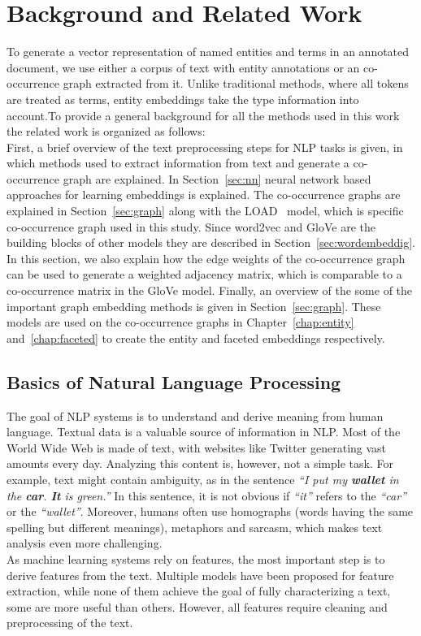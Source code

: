 
\chapter{Background and Related Work}\label{chap:background}
To generate a vector representation of named entities and terms in an annotated document, we use either a corpus of text with entity annotations or an co-occurrence graph extracted from it. Unlike traditional methods, where all tokens are treated as terms, entity embeddings take the type information into account.To provide a general background for all the methods used in this work the related work is organized as follows:\\
First, a brief overview of the text preprocessing steps for NLP tasks is given, in which methods used to extract information from text and generate a co-occurrence graph are explained. In Section~\ref{sec:nn} neural network based approaches for learning embeddings is explained. The co-occurrence graphs are explained in Section~\ref{sec:graph} along with the LOAD~ model, which is specific co-occurrence graph used in this study.  Since word2vec and GloVe are the building blocks of other models they are described in Section~\ref{sec:wordembeddig}. In this section, we also explain how the edge weights of the co-occurrence graph can be used to generate a weighted adjacency matrix, which is comparable to a co-occurrence matrix in the GloVe model.  Finally, an overview of the some of the important graph embedding methods is given in Section~\ref{sec:graph}. These models are used on the co-occurrence graphs in Chapter~\ref{chap:entity} and~\ref{chap:faceted} to create the entity and faceted embeddings respectively. 

\section{Basics of Natural Language Processing}
The goal of NLP systems is to understand and derive meaning from human language. Textual data is a valuable source of information in NLP. Most of the World Wide Web is made of text, with websites like Twitter generating vast amounts every day. Analyzing this content is, however, not a simple task. For example, text might contain ambiguity, as in the sentence \emph{``I put my \textbf{wallet} in the  \textbf{car}.  \textbf{It} is green.''} In this sentence, it is not obvious if \emph{``it''} refers to the \emph{``car''} or the  \emph{``wallet''}. Moreover, humans often use homographs (words having the same spelling but different meanings), metaphors and sarcasm, which makes text analysis even more challenging. \\
As machine learning systems rely on features, the most important step is to derive features from the text. Multiple models have been proposed for feature extraction, while none of them achieve the goal of fully characterizing a text, some are more useful than others. However, all features require cleaning and preprocessing of the text. 

